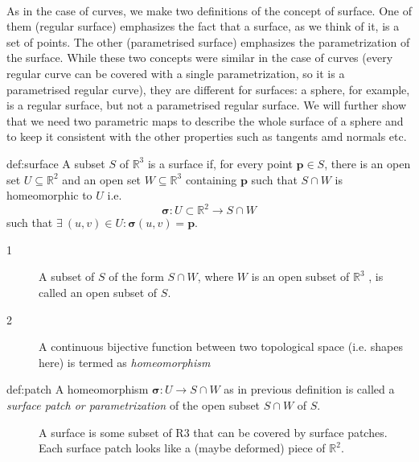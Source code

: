 \documentclass{notes}
\newcommand{\R}[1]{\mathbb{R}^{#1} }
\newcommand{\bsigma}{\bm{\sigma}}
\begin{document}
\paragraph{}
As in the case of curves, we make two definitions of the concept of surface. One of them (regular
surface) emphasizes the fact that a surface, as we think of it, is a set of points.
The other (parametrised surface) emphasizes the parametrization of the surface. While these two concepts
were similar in the case of curves (every regular curve can be covered with a single parametrization,
so it is a parametrised regular curve), they are different for surfaces: a sphere, for example, is a
regular surface, but not a parametrised regular surface. We will further show that we need two parametric maps
to describe the whole surface of a sphere and to keep it consistent with the other properties such as tangents amd normals etc.


\begin{definition}[Surface]{def:surface}
	A subset \(S\) of \(\mathbb{R}^3\) is a surface if, for every point \(\mathbf{p} \in S\), there is an open set \(U
	\subseteq \mathbb{R}^2\)
    and an open set \(W \subseteq \mathbb{R}^3\) containing \(\mathbf{p}\) such that \(S\cap W\) is homeomorphic
	to \(U\) i.e.
	\[\bsigma: U\subset \R{2} \to S\cap W \]
	such that \(\exists \ (u, v) \in U : \bsigma(u, v) = \mathbf{p}\).
	\end{definition}
	\begin{description}
		\item[1] A subset of \(S\) of the form \(S\cap W\), where \(W\) is an open subset
		of \(\mathbb{R}^3\) , is called an open subset of \(S\). 
		\item[2] A continuous bijective function between two topological space (i.e. shapes here) is termed
		as \textit{homeomorphism}
	\end{description}

\begin{definition}{def:patch}
	A homeomorphism \(\bsigma : U \to S \cap W\) as in
	previous definition is called a \textit{surface patch or parametrization} of the open subset
	\(S\cap W\) of \(S\).
\end{definition}
\begin{description}
	\item[] A surface is some subset of R3
	that can be covered by surface patches. Each surface patch looks like a (maybe deformed) piece
	of \(\R{2}\).
\end{description}
\end{document}
